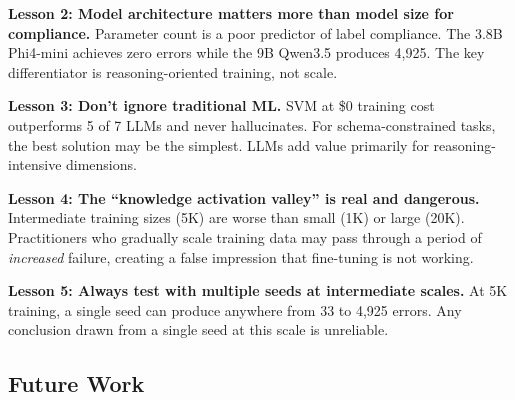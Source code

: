 \documentclass[journal]{IEEEtran}
\begin{document}
\textbf{Lesson 2: Model architecture matters more than model size for compliance.} Parameter count is a poor predictor of label compliance. The 3.8B Phi4-mini achieves zero errors while the 9B Qwen3.5 produces 4,925. The key differentiator is reasoning-oriented training, not scale.

\textbf{Lesson 3: Don't ignore traditional ML.} SVM at \$0 training cost outperforms 5 of 7 LLMs and never hallucinates. For schema-constrained tasks, the best solution may be the simplest. LLMs add value primarily for reasoning-intensive dimensions.

\textbf{Lesson 4: The ``knowledge activation valley'' is real and dangerous.} Intermediate training sizes (5K) are worse than small (1K) or large (20K). Practitioners who gradually scale training data may pass through a period of \emph{increased} failure, creating a false impression that fine-tuning is not working.

\textbf{Lesson 5: Always test with multiple seeds at intermediate scales.} At 5K training, a single seed can produce anywhere from 33 to 4,925 errors. Any conclusion drawn from a single seed at this scale is unreliable.

\subsection{Future Work}
\end{document}
